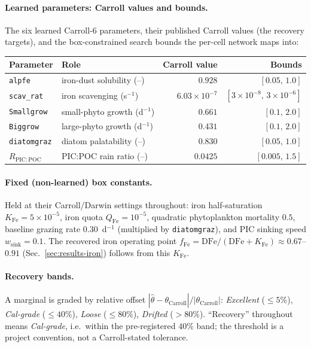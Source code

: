 \documentclass[11pt]{article}
\begin{document}
\paragraph{Learned parameters: Carroll values and bounds.}
The six learned Carroll-6 parameters, their published Carroll values (the recovery
targets), and the box-constrained search bounds the per-cell network maps into:
\begin{center}
\begin{tabular}{@{}llrr@{}}
\toprule
Parameter & Role & Carroll value & Bounds \\
\midrule
\texttt{alpfe}      & iron-dust solubility (--)      & $0.928$     & $[0.05,\,1.0]$ \\
\texttt{scav\_rat}  & iron scavenging (s$^{-1}$)     & $6.03\times10^{-7}$ & $[3\times10^{-8},\,3\times10^{-6}]$ \\
\texttt{Smallgrow}  & small-phyto growth (d$^{-1}$)  & $0.661$     & $[0.1,\,2.0]$ \\
\texttt{Biggrow}    & large-phyto growth (d$^{-1}$)  & $0.431$     & $[0.1,\,2.0]$ \\
\texttt{diatomgraz} & diatom palatability (--)       & $0.830$     & $[0.05,\,1.0]$ \\
$R_{\mathrm{PIC:POC}}$ & PIC:POC rain ratio (--)     & $0.0425$    & $[0.005,\,1.5]$ \\
\bottomrule
\end{tabular}
\end{center}

\paragraph{Fixed (non-learned) box constants.}
Held at their Carroll/Darwin settings throughout: iron half-saturation
$K_{\mathrm{Fe}}=5\times10^{-5}$, iron quota $Q_{\mathrm{Fe}}=10^{-5}$, quadratic
phytoplankton mortality $0.5$, baseline grazing rate $0.30$~d$^{-1}$ (multiplied by
\texttt{diatomgraz}), and PIC sinking speed $w_{\mathrm{sink}}=0.1$. The recovered
iron operating point $f_{\mathrm{Fe}}=\mathrm{DFe}/(\mathrm{DFe}+K_{\mathrm{Fe}})
\approx0.67$--$0.91$ (Sec.~\ref{sec:results-iron}) follows from this
$K_{\mathrm{Fe}}$.

\paragraph{Recovery bands.}
A marginal is graded by relative offset
$|\hat\theta-\theta_{\mathrm{Carroll}}|/|\theta_{\mathrm{Carroll}}|$:
\emph{Excellent} ($\le5\%$), \emph{Cal-grade} ($\le40\%$), \emph{Loose}
($\le80\%$), \emph{Drifted} ($>80\%$). ``Recovery'' throughout means
\emph{Cal-grade}, i.e.\ within the pre-registered $40\%$ band; the threshold is a
project convention, not a Carroll-stated tolerance.
\end{document}

